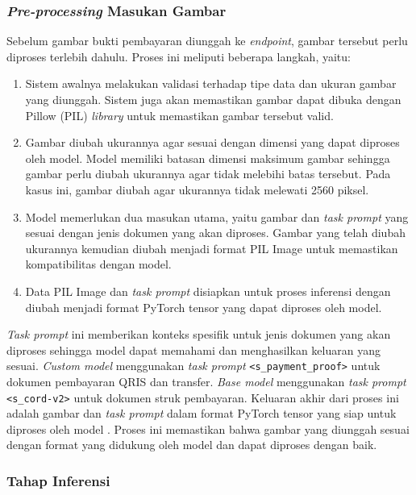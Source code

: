 \subsubsection{\emph{Pre-processing} Masukan Gambar}
\label{subsec:pre-processing}
Sebelum gambar bukti pembayaran diunggah ke \emph{endpoint}, gambar tersebut perlu diproses terlebih dahulu. Proses ini meliputi beberapa langkah, yaitu:
\begin{enumerate}
    \item Sistem awalnya melakukan validasi terhadap tipe data dan ukuran gambar yang diunggah. Sistem juga akan memastikan gambar dapat dibuka dengan Pillow (PIL) \emph{library} untuk memastikan gambar tersebut valid.
    \item Gambar diubah ukurannya agar sesuai dengan dimensi yang dapat diproses oleh model. Model \donut{} memiliki batasan dimensi maksimum gambar sehingga gambar perlu diubah ukurannya agar tidak melebihi batas tersebut. Pada kasus ini, gambar diubah agar ukurannya tidak melewati 2560 piksel.
    \item Model memerlukan dua masukan utama, yaitu gambar dan \emph{task prompt} yang sesuai dengan jenis dokumen yang akan diproses. Gambar yang telah diubah ukurannya kemudian diubah menjadi format PIL Image untuk memastikan kompatibilitas dengan model.
    \item Data PIL Image dan \emph{task prompt} disiapkan untuk proses inferensi dengan diubah menjadi format PyTorch tensor yang dapat diproses oleh model.
\end{enumerate}

\emph{Task prompt} ini memberikan konteks spesifik untuk jenis dokumen yang akan diproses sehingga model dapat memahami dan menghasilkan keluaran yang sesuai. \emph{Custom model} menggunakan \emph{task prompt} \texttt{<s\_payment\_proof>} untuk dokumen pembayaran QRIS dan transfer. \emph{Base model} menggunakan \emph{task prompt} \texttt{<s\_cord-v2>} untuk dokumen struk pembayaran. Keluaran akhir dari proses ini adalah gambar dan \emph{task prompt} dalam format PyTorch tensor yang siap untuk diproses oleh model \donut. Proses ini memastikan bahwa gambar yang diunggah sesuai dengan format yang didukung oleh model dan dapat diproses dengan baik.

\subsubsection{Tahap Inferensi}
\label{subsubsec:proses-inferens}

